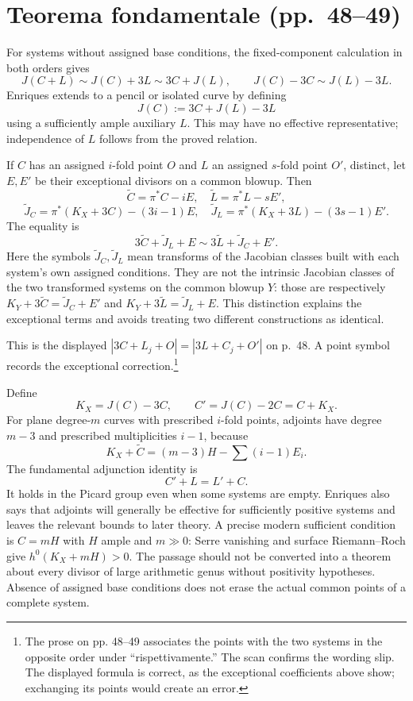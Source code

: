 \section[Teorema fondamentale]{Teorema fondamentale (pp.~48--49)}\label{commentary-II-3}

For systems without assigned base conditions, the fixed-component calculation in both orders gives \[
J(C+L)\sim J(C)+3L\sim3C+J(L),\qquad
J(C)-3C\sim J(L)-3L.
\] Enriques extends to a pencil or isolated curve by defining \[
J(C):=3C+J(L)-3L
\] using a sufficiently ample auxiliary \(L\). This may have no effective representative; independence of \(L\) follows from the proved relation.

If \(C\) has an assigned \(i\)-fold point \(O\) and \(L\) an assigned \(s\)-fold point \(O'\), distinct, let \(E,E'\) be their exceptional divisors on a common blowup. Then \[
\widetilde C=\pi^*C-iE,\quad \widetilde L=\pi^*L-sE',
\] \[
\widetilde J_C=\pi^*(K_X+3C)-(3i-1)E,\quad
\widetilde J_L=\pi^*(K_X+3L)-(3s-1)E'.
\] The equality is \[
3\widetilde C+\widetilde J_L+E
\sim3\widetilde L+\widetilde J_C+E'.
\] Here the symbols \(\widetilde J_C,\widetilde J_L\) mean transforms of the Jacobian classes built with each system's own assigned conditions. They are not the intrinsic Jacobian classes of the two transformed systems on the common blowup \(Y\): those are respectively \(K_Y+3\widetilde C=\widetilde J_C+E'\) and \(K_Y+3\widetilde L=\widetilde J_L+E\). This distinction explains the exceptional terms and avoids treating two different constructions as identical.

This is the displayed \(|3C+L_j+O|=|3L+C_j+O'|\) on p.~48. A point symbol records the exceptional correction.\footnote{The prose on pp. 48--49 associates the points with the two systems in the opposite order under ``rispettivamente.'' The scan confirms the wording slip. The displayed formula is correct, as the exceptional coefficients above show; exchanging its points would create an error.}

Define \[
K_X=J(C)-3C,\qquad C'=J(C)-2C=C+K_X.
\] For plane degree-\(m\) curves with prescribed \(i\)-fold points, adjoints have degree \(m-3\) and prescribed multiplicities \(i-1\), because \[
K_X+\widetilde C=(m-3)H-\sum(i-1)E_i.
\] The fundamental adjunction identity is \[
C'+L=L'+C.
\] It holds in the Picard group even when some systems are empty. Enriques also says that adjoints will generally be effective for sufficiently positive systems and leaves the relevant bounds to later theory. A precise modern sufficient condition is \(C=mH\) with \(H\) ample and \(m\gg0\): Serre vanishing and surface Riemann--Roch give \(h^0(K_X+mH)>0\). The passage should not be converted into a theorem about every divisor of large arithmetic genus without positivity hypotheses. Absence of assigned base conditions does not erase the actual common points of a complete system.

